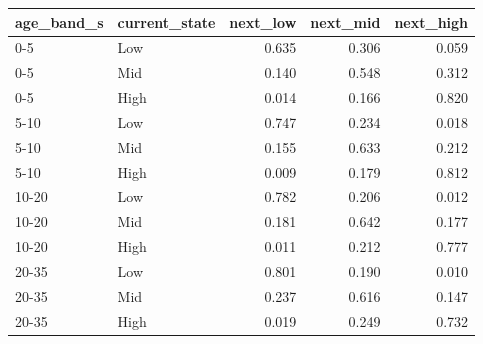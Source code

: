 \begin{tabular}{llrrr}
\toprule
age\_band\_s & current\_state & next\_low & next\_mid & next\_high \\
\midrule
0-5 & Low & 0.635 & 0.306 & 0.059 \\
0-5 & Mid & 0.140 & 0.548 & 0.312 \\
0-5 & High & 0.014 & 0.166 & 0.820 \\
5-10 & Low & 0.747 & 0.234 & 0.018 \\
5-10 & Mid & 0.155 & 0.633 & 0.212 \\
5-10 & High & 0.009 & 0.179 & 0.812 \\
10-20 & Low & 0.782 & 0.206 & 0.012 \\
10-20 & Mid & 0.181 & 0.642 & 0.177 \\
10-20 & High & 0.011 & 0.212 & 0.777 \\
20-35 & Low & 0.801 & 0.190 & 0.010 \\
20-35 & Mid & 0.237 & 0.616 & 0.147 \\
20-35 & High & 0.019 & 0.249 & 0.732 \\
\bottomrule
\end{tabular}
